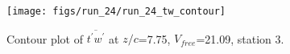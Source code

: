 \begin{figure}[H]
\centering
\texttt{[image: figs/run\_24/run\_24\_tw\_contour]}
\caption{Contour plot of $\overline{t^\prime w^\prime}$ at $z/c$=7.75, $V_{free}$=21.09, station 3.}
\label{fig:run_24_tw_contour}
\end{figure}


